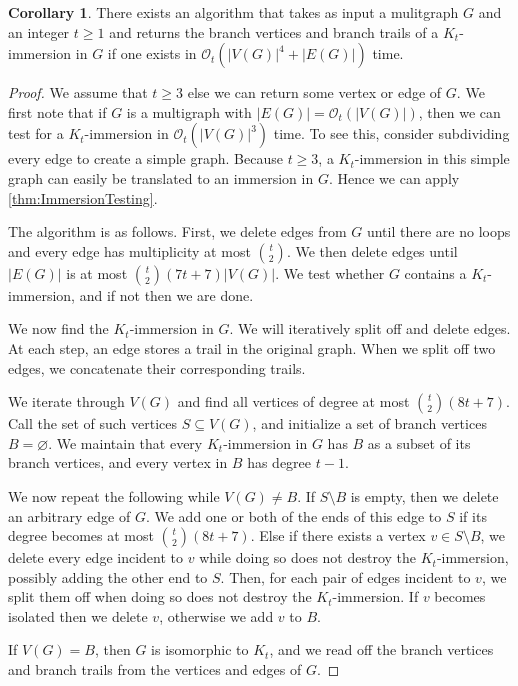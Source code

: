 \documentclass{article}
\theoremstyle{definition}
\newtheorem{corollary}[environment]{Corollary}
\begin{document}
\begin{corollary}\label{cor:FindingImmersionAlg}
    There exists an algorithm that takes as input a mulitgraph $G$ and an integer $t \geq 1$ and returns the branch vertices and branch trails of a $K_t$-immersion in $G$ if one exists in $\mathcal{O}_t(|V(G)|^4 + |E(G)|)$ time.
\end{corollary}
\begin{proof}
    We assume that $t \geq 3$ else we can return some vertex or edge of $G$. We first note that if $G$ is a multigraph with $|E(G)| = \mathcal{O}_t(|V(G)|)$, then we can test for a $K_t$-immersion in $\mathcal{O}_t(|V(G)|^3)$ time. To see this, consider subdividing every edge to create a simple graph. Because $t \geq 3$, a $K_t$-immersion in this simple graph can easily be translated to an immersion in $G$. Hence we can apply \cref{thm:ImmersionTesting}.

    The algorithm is as follows. First, we delete edges from $G$ until there are no loops and every edge has multiplicity at most $\binom{t}{2}$. We then delete edges until $|E(G)|$ is at most $\binom{t}{2}(7t+7)|V(G)|$. We test whether $G$ contains a $K_t$-immersion, and if not then we are done.

    We now find the $K_t$-immersion in $G$. We will iteratively split off and delete edges. At each step, an edge stores a trail in the original graph. When we split off two edges, we concatenate their corresponding trails.

    We iterate through $V(G)$ and find all vertices of degree at most $\binom{t}{2}(8t+7)$. Call the set of such vertices $S \subseteq V(G)$, and initialize a set of branch vertices $B = \varnothing$. We maintain that every $K_t$-immersion in $G$ has $B$ as a subset of its branch vertices, and every vertex in $B$ has degree $t-1$.

    We now repeat the following while $V(G) \neq B$. If $S \setminus B$ is empty, then we delete an arbitrary edge of $G$. We add one or both of the ends of this edge to $S$ if its degree becomes at most $\binom{t}{2}(8t+7)$. Else if there exists a vertex $ v \in S \setminus B$, we delete every edge incident to $v$ while doing so does not destroy the $K_t$-immersion, possibly adding the other end to $S$. Then, for each pair of edges incident to $v$, we split them off when doing so does not destroy the $K_t$-immersion. If $v$ becomes isolated then we delete $v$, otherwise we add $v$ to $B$.

    If $V(G) = B$, then $G$ is isomorphic to $K_t$, and we read off the branch vertices and branch trails from the vertices and edges of $G$.


\end{proof}
\end{document}
